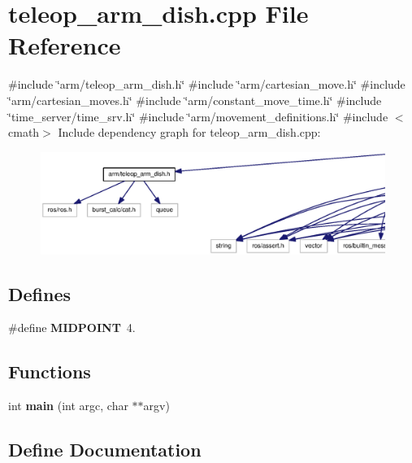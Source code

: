 \section{teleop\-\_\-arm\-\_\-dish.\-cpp \-File \-Reference}
\label{teleop__arm__dish_8cpp}
{\ttfamily \#include \char`\"{}arm/teleop\-\_\-arm\-\_\-dish.\-h\char`\"{}}\*
{\ttfamily \#include \char`\"{}arm/cartesian\-\_\-move.\-h\char`\"{}}\*
{\ttfamily \#include \char`\"{}arm/cartesian\-\_\-moves.\-h\char`\"{}}\*
{\ttfamily \#include \char`\"{}arm/constant\-\_\-move\-\_\-time.\-h\char`\"{}}\*
{\ttfamily \#include \char`\"{}time\-\_\-server/time\-\_\-srv.\-h\char`\"{}}\*
{\ttfamily \#include \char`\"{}arm/movement\-\_\-definitions.\-h\char`\"{}}\*
{\ttfamily \#include $<$cmath$>$}\*
\-Include dependency graph for teleop\-\_\-arm\-\_\-dish.\-cpp\-:\nopagebreak
\begin{figure}[H]
\begin{center}
\leavevmode
\includegraphics[width=350pt]{teleop__arm__dish_8cpp__incl}
\end{center}
\end{figure}
\subsection*{\-Defines}
\begin{DoxyCompactItemize}
\item 
\#define {\bf \-M\-I\-D\-P\-O\-I\-N\-T}~4.
\end{DoxyCompactItemize}
\subsection*{\-Functions}
\begin{DoxyCompactItemize}
\item 
int {\bf main} (int argc, char $\ast$$\ast$argv)
\end{DoxyCompactItemize}


\subsection{\-Define \-Documentation}

